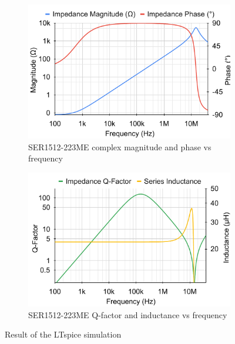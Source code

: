 \begin{figure}[H]
    \begin{subfigure}[b]{0.50\textwidth}
        \includegraphics[width=\textwidth]{Bilder/Kapitel3/SER223_BodePlot_Spice.pdf}
        \caption{SER1512-223ME complex magnitude and phase vs frequency}
    \end{subfigure}
    \begin{subfigure}[b]{0.50\textwidth}
        \includegraphics[width=\textwidth]{Bilder/Kapitel3/SER223_QLPlot_Spice.pdf}
        \caption{SER1512-223ME Q-factor and inductance vs frequency}
    \end{subfigure}
    \caption{Result of the LTspice simulation}
    \label{fig:LTspice_Frequency_Response}
\end{figure}


